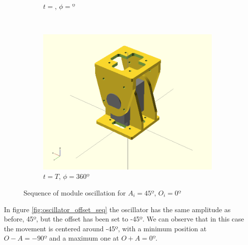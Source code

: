 \begin{figure}[h]
\begin{subfigure}[b]{0.18\textwidth}
                \caption{$t = $, $\phi=º$}
                \label{fig:Gait_osc_center_62_5-3}
        \end{subfigure}
        ~
        \begin{subfigure}[b]{0.18\textwidth}
         	   \centering
                \includegraphics[width=\textwidth]{images/Gait_osc_center_90.png}
                \caption{$t = T$, $\phi=360º$}
                \label{fig:Gait_osc_center_90-3}
        \end{subfigure}
        \caption{Sequence of module oscillation for $A_i = 45º$, $O_i = 0º$}\label{fig:oscillator_center_seq}
\end{figure}

In figure \ref{fig:oscillator_offset_seq} the oscillator has the same amplitude as before, 45º, but the offset has been set to -45º. We can observe that in this case the movement is centered around -45º, with a minimum position at  $ O - A = -90º$ and a maximum one at $O + A = 0º$.\\

